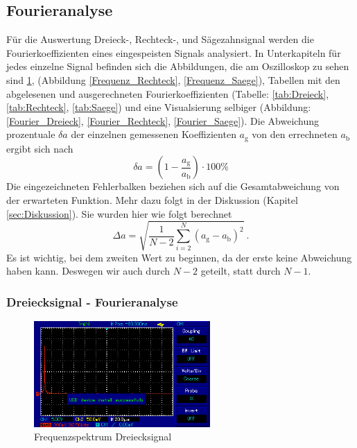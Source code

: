 \subsection{Fourieranalyse}
Für die Auswertung Dreieck-, Rechteck-, und Sägezahnsignal werden die Fourierkoeffizienten eines eingespeisten Signals analysiert. In Unterkapiteln für jedes einzelne Signal befinden sich die Abbildungen, die am Oszilloskop zu sehen sind \ref{Frequenz_Dreieck}, (Abbildung \ref{Frequenz_Rechteck}, \ref{Frequenz_Saege}), Tabellen mit den abgelesenen und ausgerechneten Fourierkoeffizienten (Tabelle: \ref{tab:Dreieck}, \ref{tab:Rechteck}, \ref{tab:Saege})  und eine Visualsierung selbiger (Abbildung: \ref{Fourier_Dreieck}, \ref{Fourier_Rechteck}, \ref{Fourier_Saege}).
Die Abweichung prozentuale $\delta a$ der einzelnen gemessenen Koeffizienten $a_\text{g}$ von den  errechneten $a_\text{b}$ ergibt sich nach
\begin{equation}
\delta a = \left(1 - \frac{a_\text{g}}{a_\text{b}}\right) \cdot 100 \%
\end{equation}
Die eingezeichneten Fehlerbalken beziehen sich auf die Gesamtabweichung von der erwarteten Funktion. Mehr dazu folgt in der Diskussion (Kapitel  \ref{sec:Diskussion}).
Sie wurden hier wie folgt berechnet
\begin{equation}
\Delta a =\sqrt{ \frac{1}{N-2} \sum_{i=2}^{N} (a_\text{g} - a_\text{b})^2 } \ .
\label{eq:Abweichung}
\end{equation}
Es ist wichtig, bei dem zweiten Wert zu beginnen, da der erste keine Abweichung haben kann. Deswegen wir auch durch $N-2$ geteilt, statt durch $N-1$.
\clearpage

\subsubsection{Dreiecksignal - Fourieranalyse}

\begin{figure}[h!]
	\centering
	\includegraphics[width=0.6\textwidth]{Dreieck.png}
	\caption{Frequenzspektrum Dreiecksignal}
	\label{Frequenz_Dreieck}
\end{figure}

